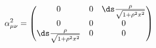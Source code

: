 \begin{equation}
\alpha_{\mu\nu}^2 = \begin{pmatrix}  0 & 0 &
\ds \frac{\rho}{\sqrt{1+\rho^2x^2}}
\\ 0 & 0 & 0 \\ \ds \frac{\rho}{\sqrt{1+\rho^2x^2}} & 0 & 0
\end{pmatrix}
\label{2.29a}
\end{equation}

